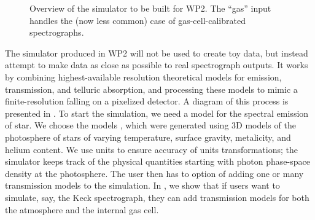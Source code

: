 \documentclass[12pt]{article}
\begin{document}
\begin{figure}[t!]
        \caption{Overview of the simulator to be built for WP2. The ``gas'' input handles the (now less common) case of gas-cell-calibrated spectrographs.\label{fig:wp2}}
    \end{figure}

The simulator produced in WP2 will not be used to create toy data, but instead attempt to make data as close as possible to real spectrograph outputs.
It works by combining highest-available resolution theoretical models for emission, transmission, and telluric absorption, and processing these models to mimic a finite-resolution falling on a pixelized detector.
A diagram of this process is presented in . To start the simulation, we need a model for the spectral emission of star. We choose the  models \cite{phoenix}, which were generated using 3D models of the photosphere of stars of varying temperature, surface gravity, metalicity, and helium content. We use  \cite{astropy} units to ensure accuracy of units transformations; the simulator keeps track of the physical quantities starting with photon phase-space density at the photosphere.
The user then has to option of adding one or many transmission models to the simulation. In , we show that if users want to simulate, say, the Keck  spectrograph, they can add transmission models for both the atmosphere and the internal gas cell. 
\end{document}
